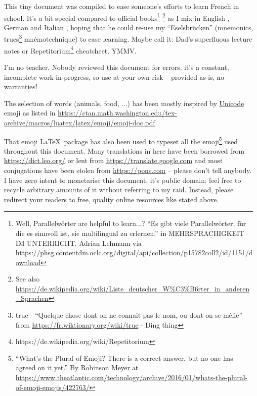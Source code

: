 This tiny document was compiled to ease someone's efforts to learn French\nolinebreak{} in school.
It's a bit special compared to official books\footnote{Well, Parallelwörter are helpful to learn...? ``Es gibt viele
Parallelwörter, für die es sinnvoll ist, sie multilingual zu erlernen.'' in MEHRSPRACHIGKEIT IM UNTERRICHT, Adrian Lehmann via
\url{https://phsg.contentdm.oclc.org/digital/api/collection/p15782coll2/id/1151/download}}
\footnote{See also \url{https://de.wikipedia.org/wiki/Liste_deutscher_W\%C3\%B6rter_in_anderen_Sprachen}}
as I mix in English , German  and Italian , hoping that he could re-use my ``Eselsbrücken''
(mnemonics, trucs\footnote{truc - ``Quelque chose dont on ne connait pas le nom, ou dont on se méfie'' from
\url{https://fr.wiktionary.org/wiki/truc} -  Ding  thing} mnémotechnique) to ease learning.
Maybe call it: Dad's superfluous lecture notes or Repetitorium\footnote{https://de.wikipedia.org/wiki/Repetitorium} cheatsheet. YMMV.

{\huge {} }

I'm no teacher. Nobody reviewed this document for errors, it's a constant, incomplete work-in-progress, so use at your own risk -- provided as-is, no warranties!

The selection of words (animals, food, ...) has been mostly inspired by
\href{https://twitter.com/unicode}{Unicode} emoji as listed in \url{https://ctan.math.washington.edu/tex-archive/macros/luatex/latex/emoji/emoji-doc.pdf}

That emoji \LaTeX\ package has also been used to typeset all the emoji\footnote{``What's the Plural of Emoji?
There is a correct answer, but no one has agreed on it yet.''
By Robinson Meyer at \url{https://www.theatlantic.com/technology/archive/2016/01/whats-the-plural-of-emoji-emojis/422763/}} used throughout this document.
Many translations in here have been borrowed from \url{https://dict.leo.org/} or lent from
\url{https://translate.google.com} and most conjugations have been stolen from \url{https://pons.com}
-- please don't tell anybody. I have zero intent to monetarise this document, it's public domain;
feel free to recycle arbitrary amounts of it without referring to my raid.
Instead, please redirect your readers to free, quality online resources like stated above.
